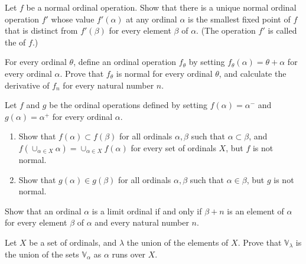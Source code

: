 \documentclass{article}
\begin{document}
\begin{exercise}
  \label{exe:e5fhwe1c}
  Let \(f\) be a normal ordinal operation.  Show that there is a
  unique normal ordinal operation \(f'\) whose value \(f'(\alpha)\) at
  any ordinal \(\alpha\) is the smallest fixed point of \(f\) that is
  distinct from \(f'(\beta)\) for every element \(\beta\) of
  \(\alpha\).  (The operation \(f'\) is called the
   of \(f\).)
\end{exercise}

\begin{exercise}
  \label{exe:hqet5ayg}
  For every ordinal \(\theta\), define an ordinal operation
  \(f_\theta\) by setting \(f_\theta(\alpha) = \theta + \alpha\) for
  every ordinal \(\alpha\).  Prove that \(f_\theta\) is normal for
  every ordinal \(\theta\), and calculate the derivative of \(f_n\)
  for every natural number \(n\).
\end{exercise}

\begin{exercise}
  \label{exe:wezu6n6e}
  Let \(f\) and \(g\) be the ordinal operations defined by setting
  \(f(\alpha) = \alpha^-\) and \(g(\alpha) = \alpha^+\) for every
  ordinal \(\alpha\).
  \begin{enumerate}
  \item Show that \(f(\alpha) \subset f(\beta)\) for all ordinals
    \(\alpha, \beta\) such that \(\alpha \subset \beta\), and
    \(f(\cup_{\alpha \in X} \alpha) = \cup_{\alpha \in X} f(\alpha)\)
    for every set of ordinals \(X\), but \(f\) is not normal.
  \item Show that \(g(\alpha) \in g(\beta)\) for all ordinals
    \(\alpha, \beta\) such that \(\alpha \in \beta\), but \(g\) is not
    normal.
  \end{enumerate}
\end{exercise}

\begin{exercise}
  \label{exe:fl6hcnkt}
  Show that an ordinal \(\alpha\) is a limit ordinal if and only if
  \(\beta + n\) is an element of \(\alpha\) for every element
  \(\beta\) of \(\alpha\) and every natural number \(n\).
\end{exercise}

\begin{exercise}
  \label{exe:jmxnb6v7}
  Let \(X\) be a set of ordinals, and \(\lambda\) the union of the
  elements of \(X\).  Prove that \(\mathbb{V}_\lambda\) is the union
  of the sets \(\mathbb{V}_\alpha\) as \(\alpha\) runs over \(X\).
\end{exercise}
\end{document}
